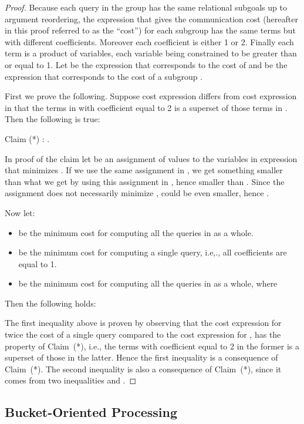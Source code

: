 \begin{proof}
Because each query in the group has the same relational subgoals up to argument reordering,  the expression that gives the communication cost (hereafter in this proof referred to as the ``cost'') for each subgroup has the same terms but with different coefficients.
Moreover each coefficient is either 1 or 2. Finally each term is a product of variables, each variable being constrained to be greater than or equal to 1. Let  be the expression that corresponds to the cost of  and  be the expression
that corresponds to the cost of a subgroup .

First we prove the following. Suppose cost expression  differs from cost expression  in that the terms in  with coefficient equal to 2 is a superset of those terms in .  Then the following is true:

Claim (*) : .

In proof of the claim let  be an assignment  of values to the variables in expression    that minimizes .
If we use the same assignment  in , we get something smaller than
what we get by using this assignment  in , hence smaller than
. Since the assignment  does not necessarily minimize ,  could be even smaller, hence .

Now let:

\begin{itemize}
\item  be the minimum cost for computing all the queries in  as a whole.

\item  be the minimum cost for computing a single query, i.e,., all coefficients are equal  to 1.
\item  be the minimum cost for computing all the queries in  as a whole, where 
\end{itemize}

Then the following holds:



The first inequality above is proven by observing that the cost expression for twice the cost of a single query compared to the
cost expression for , has the property of Claim~(*), i.e., the terms with coefficient equal to 2 in the former is a superset
of those in the latter. Hence the first inequality is a consequence of Claim~(*). The second inequality is also a consequence of Claim~(*),
since it comes from two inequalities  and .
\end{proof}


\subsection{Bucket-Oriented Processing}
\label{bucket-oriented-subsect}

